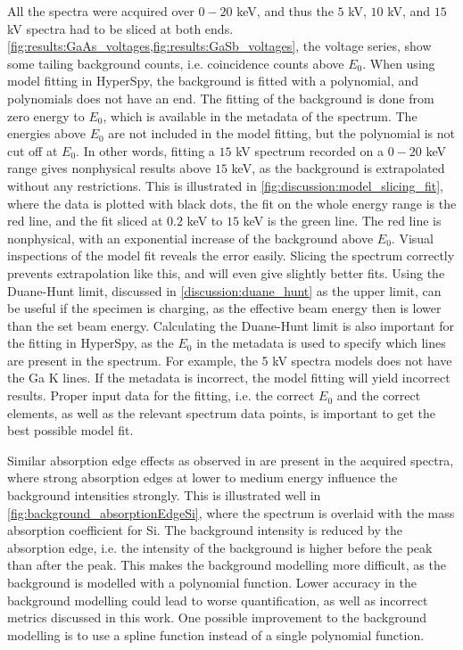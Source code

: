 All the spectra were acquired over $0-20$ keV, and thus the $5$ kV, $10$ kV, and $15$ kV spectra had to be sliced at both ends.
\cref{fig:results:GaAs_voltages,fig:results:GaSb_voltages}, the voltage series, show some tailing background counts, i.e. coincidence counts above $E_0$.
When using model fitting in HyperSpy, the background is fitted with a polynomial, and polynomials does not have an end.
The fitting of the background is done from zero energy to $E_0$, which is available in the metadata of the spectrum.
The energies above $E_0$ are not included in the model fitting, but the polynomial is not cut off at $E_0$.
In other words, fitting a $15$ kV spectrum recorded on a $0-20$ keV range gives nonphysical results above $15$ keV, as the background is extrapolated without any restrictions.
This is illustrated in \cref{fig:discussion:model_slicing_fit}, where the data is plotted with black dots, the fit on the whole energy range is the red line, and the fit sliced at $0.2$ keV to $15$ keV is the green line.
The red line is nonphysical, with an exponential increase of the background above $E_0$.
Visual inspections of the model fit reveals the error easily.
Slicing the spectrum correctly prevents extrapolation like this, and will even give slightly better fits.
Using the Duane-Hunt limit, discussed in \cref{discussion:duane_hunt} as the upper limit, can be useful if the specimen is charging, as the effective beam energy then is lower than the set beam energy.
Calculating the Duane-Hunt limit is also important for the fitting in HyperSpy, as the $E_0$ in the metadata is used to specify which lines are present in the spectrum.
For example, the 5 kV spectra models does not have the Ga K lines.
If the metadata is incorrect, the model fitting will yield incorrect results.
Proper input data for the fitting, i.e. the correct $E_0$ and the correct elements, as well as the relevant spectrum data points, is important to get the best possible model fit.


Similar absorption edge effects as observed in \cite{project_report} are present in the acquired spectra, where strong absorption edges at lower to medium energy influence the background intensities strongly.
This is illustrated well in \cref{fig:background_absorptionEdgeSi}, where the spectrum is overlaid with the mass absorption coefficient for Si.
The background intensity is reduced by the absorption edge, i.e. the intensity of the background is higher before the peak than after the peak.
This makes the background modelling more difficult, as the background is modelled with a polynomial function.
Lower accuracy in the background modelling could lead to worse quantification, as well as incorrect metrics discussed in this work.
One possible improvement to the background modelling is to use a spline function instead of a single polynomial function.


